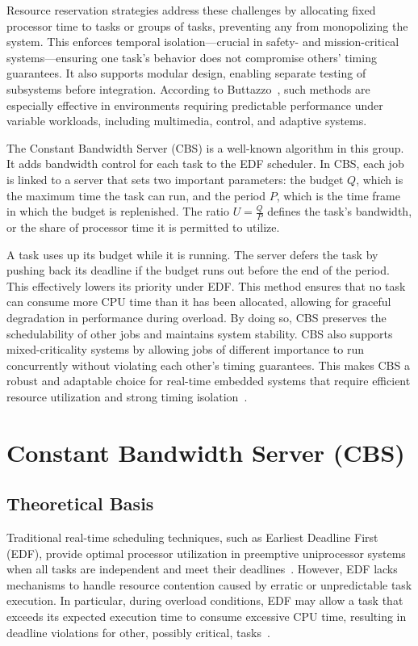 \documentclass[conference]{IEEEtran}
\begin{document}
Resource reservation strategies address these challenges by allocating fixed processor time to tasks or groups of tasks, preventing any from monopolizing the system. This enforces temporal isolation—crucial in safety- and mission-critical systems—ensuring one task's behavior does not compromise others' timing guarantees. It also supports modular design, enabling separate testing of subsystems before integration. According to Buttazzo~\cite{buttazzo2011hard}, such methods are especially effective in environments requiring predictable performance under variable workloads, including multimedia, control, and adaptive systems.

The Constant Bandwidth Server (CBS) is a well-known algorithm in this group. It adds bandwidth control for each task to the EDF scheduler. In CBS, each job is linked to a server that sets two important parameters: the budget $Q$, which is the maximum time the task can run, and the period $P$, which is the time frame in which the budget is replenished. The ratio $U = \frac{Q}{P}$ defines the task’s bandwidth, or the share of processor time it is permitted to utilize.

A task uses up its budget while it is running. The server defers the task by pushing back its deadline if the budget runs out before the end of the period. This effectively lowers its priority under EDF. This method ensures that no task can consume more CPU time than it has been allocated, allowing for graceful degradation in performance during overload. By doing so, CBS preserves the schedulability of other jobs and maintains system stability. CBS also supports mixed-criticality systems by allowing jobs of different importance to run concurrently without violating each other's timing guarantees. This makes CBS a robust and adaptable choice for real-time embedded systems that require efficient resource utilization and strong timing isolation~\cite{baruah2004dynamic}.


\section{\textbf{Constant Bandwidth Server (CBS)}}

\subsection{Theoretical Basis}

Traditional real-time scheduling techniques, such as Earliest Deadline First (EDF), provide optimal processor utilization in preemptive uniprocessor systems when all tasks are independent and meet their deadlines~\cite{liu1973scheduling}. However, EDF lacks mechanisms to handle resource contention caused by erratic or unpredictable task execution. In particular, during overload conditions, EDF may allow a task that exceeds its expected execution time to consume excessive CPU time, resulting in deadline violations for other, possibly critical, tasks~\cite{buttazzo2011hard}.
\end{document}
